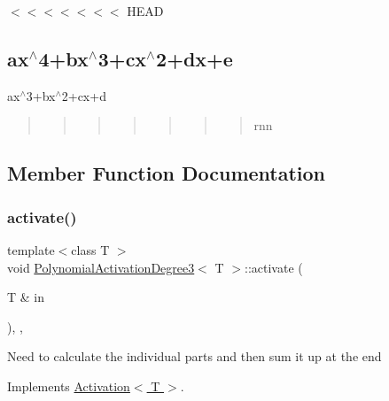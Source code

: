 $<$$<$$<$$<$$<$$<$$<$ H\+E\+AD \subsection*{ax$^\wedge$4+bx$^\wedge$3+cx$^\wedge$2+dx+e }

ax$^\wedge$3+bx$^\wedge$2+cx+d \begin{quote}
\begin{quote}
\begin{quote}
\begin{quote}
\begin{quote}
\begin{quote}
\begin{quote}
rnn\end{quote}
\end{quote}
\end{quote}
\end{quote}
\end{quote}
\end{quote}
\end{quote}


\subsection{Member Function Documentation}
\mbox{\label{classPolynomialActivationDegree3_ac68e75e02f29c445e8d8f818fc60bee1}} 
\subsubsection{\texorpdfstring{activate()}{activate()}}
{\footnotesize\ttfamily template$<$class T $>$ \\
void \hyperlink{classPolynomialActivationDegree3}{Polynomial\+Activation\+Degree3}$<$ T $>$\+::activate (\begin{DoxyParamCaption}\item[{T \&}]{in }\end{DoxyParamCaption})\hspace{0.3cm}{\ttfamily [inline]}, {\ttfamily [override]}, {\ttfamily [virtual]}}

Need to calculate the individual parts and then sum it up at the end 

Implements \hyperlink{classActivation}{Activation$<$ T $>$}.

